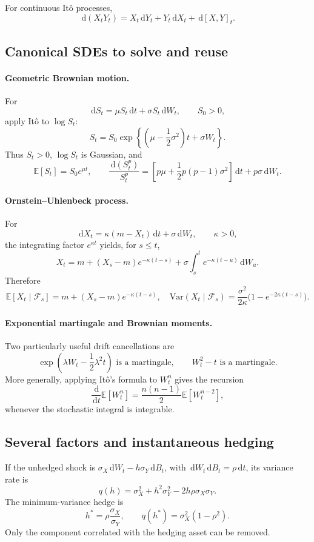 \documentclass[11pt]{article}
\newcommand{\F}{\mathcal{F}}
\newcommand{\E}{\mathbb{E}}
\newcommand{\Var}{\mathrm{Var}}
\newcommand{\dd}{\,\mathrm{d}}
\newcommand{\1}{\mathbf{1}}
\theoremstyle{plain}
\theoremstyle{definition}
\theoremstyle{remark}
\begin{document}
For continuous It\^o processes,
\[
\boxed{
\dd(X_tY_t)=X_t\dd Y_t+Y_t\dd X_t+\dd[X,Y]_t.}
\]

\subsection{Canonical SDEs to solve and reuse}

\paragraph{Geometric Brownian motion.}
For
\[
\dd S_t=\mu S_t\dd t+\sigma S_t\dd W_t,
\qquad S_0>0,
\]
apply It\^o to \(\log S_t\):
\[
\boxed{
S_t=S_0\exp\left\{
\left(\mu-\frac12\sigma^2\right)t+\sigma W_t
\right\}.}
\]
Thus \(S_t>0\), \(\log S_t\) is Gaussian, and
\[
\E[S_t]=S_0e^{\mu t},
\qquad
\frac{\dd(S_t^p)}{S_t^p}
=\left[p\mu+\frac12p(p-1)\sigma^2\right]\dd t
+p\sigma\dd W_t.
\]

\paragraph{Ornstein--Uhlenbeck process.}
For
\[
\dd X_t=\kappa(m-X_t)\dd t+\sigma\dd W_t,
\qquad \kappa>0,
\]
the integrating factor \(e^{\kappa t}\) yields, for \(s\leq t\),
\[
\boxed{
X_t=m+(X_s-m)e^{-\kappa(t-s)}
+\sigma\int_s^te^{-\kappa(t-u)}\dd W_u.}
\]
Therefore
\[
\boxed{
\E[X_t\mid\F_s]=m+(X_s-m)e^{-\kappa(t-s)},
\quad
\Var(X_t\mid\F_s)=\frac{\sigma^2}{2\kappa}
\bigl(1-e^{-2\kappa(t-s)}\bigr).}
\]

\paragraph{Exponential martingale and Brownian moments.}
Two particularly useful drift cancellations are
\[
\boxed{
\exp\left(\lambda W_t-\frac12\lambda^2t\right)
\text{ is a martingale},
\qquad W_t^2-t\text{ is a martingale}.}
\]
More generally, applying It\^o's formula to \(W_t^n\) gives the recursion
\[
\frac{\dd}{\dd t}\E[W_t^n]
=\frac{n(n-1)}2\E[W_t^{n-2}],
\]
whenever the stochastic integral is integrable.

\subsection{Several factors and instantaneous hedging}

If the unhedged shock is
\(\sigma_X\dd W_t-h\sigma_Y\dd B_t\), with
\(\dd W_t\dd B_t=\rho\dd t\), its variance rate is
\[
q(h)=\sigma_X^2+h^2\sigma_Y^2-2h\rho\sigma_X\sigma_Y.
\]
The minimum-variance hedge is
\[
\boxed{
h^*=\rho\frac{\sigma_X}{\sigma_Y},
\qquad q(h^*)=\sigma_X^2(1-\rho^2).}
\]
Only the component correlated with the hedging asset can be removed.
\end{document}

